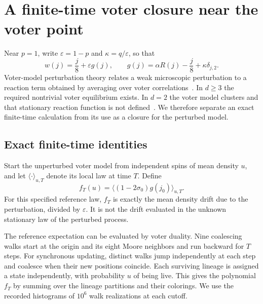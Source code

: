 \section{A finite-time voter closure near the voter point}
\label{sec:theory}

Near $p=1$, write $\varepsilon=1-p$ and $\kappa=q/\varepsilon$, so that
\begin{equation}
 w(j)=\frac j8+\varepsilon g(j),\qquad
 g(j)=\alpha R(j)-\frac j8+\kappa\delta_{j,2}.
 \label{eq:pert}
\end{equation}
Voter-model perturbation theory relates a weak microscopic perturbation to a reaction
term obtained by averaging over voter correlations~\cite{cox2013}. In $d\ge3$ the
required nontrivial voter equilibrium exists. In $d=2$ the voter model clusters and
that stationary reaction function is not defined~\cite{cox2025}. We therefore
separate an exact finite-time calculation from its use as a closure for the
perturbed model.

\subsection{Exact finite-time identities}

Start the unperturbed voter model from independent spins of mean density $u$, and
let $\langle\cdot\rangle_{u,T}$ denote its local law at time $T$. Define
\begin{equation}
 f_T(u)=\big\langle(1-2\sigma_0)g(j_0)\big\rangle_{u,T}.
 \label{eq:f}
\end{equation}
For this specified reference law, $f_T$ is exactly the mean density drift due to
the perturbation, divided by $\varepsilon$. It is not the drift evaluated in the
unknown stationary law of the perturbed process.

The reference expectation can be evaluated by voter duality. Nine coalescing walks
start at the origin and its eight Moore neighbors and run backward for $T$ steps.
For synchronous updating, distinct walks jump independently at each step and
coalesce when their new positions coincide. Each surviving lineage is assigned a
state independently, with probability $u$ of being live. This gives the polynomial
$f_T$ by summing over the lineage partitions and their colorings. We use the
recorded histograms of $10^6$ walk realizations at each cutoff.

